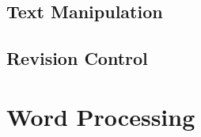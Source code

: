 \documentclass{book}
\begin{document}

%
%
%
%
%
%
%


\subsection{Text Manipulation}
\subsection{Revision Control}
\section{Word Processing}
\end{document}
